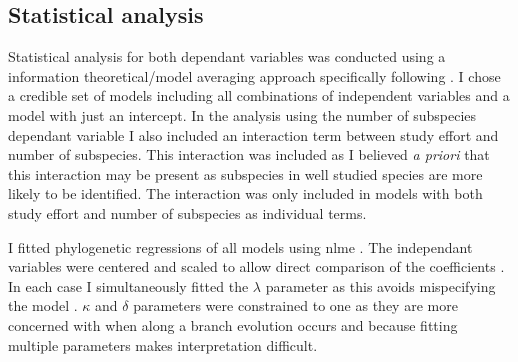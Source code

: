 


\subsection{Statistical analysis}

Statistical analysis for both dependant variables was conducted using a information theoretical/model averaging approach \cite{burnham2002model} specifically following \cite{whittingham2005habitat, whittingham2006we}.
I chose a credible set of models including all combinations of independent variables and a model with just an intercept.
In the analysis using the number of subspecies dependant variable I also included an interaction term between study effort and number of subspecies.
This interaction was included as I believed \emph{a priori} that this interaction may be present as subspecies in well studied species are more likely to be identified.
The interaction was only included in models with both study effort and number of subspecies as individual terms.

I fitted phylogenetic regressions of all models using nlme \cite{nlme}.
The independant variables were centered and scaled to allow direct comparison of the coefficients \cite{schielzeth2010simple}.
In each case I simultaneously fitted the $\lambda$ parameter as this avoids mispecifying the model \cite{revell2010phylogenetic}.
$\kappa$ and $\delta$ parameters were constrained to one as they are more concerned with when along a branch evolution occurs and because fitting multiple parameters makes interpretation difficult. 

